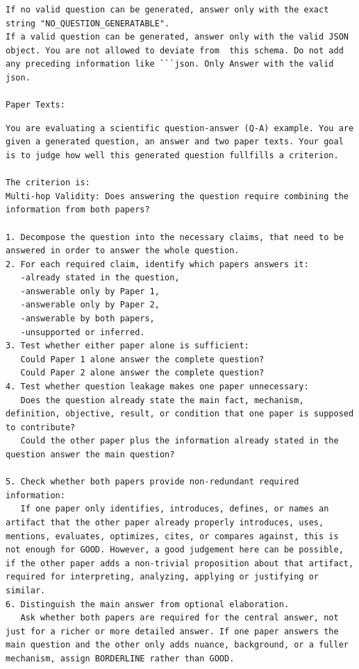 \begin{lstlisting}[caption={Question–Answer generation prompt}, label={lst:questionAnswerGenerationPrompt}]
If no valid question can be generated, answer only with the exact string "NO_QUESTION_GENERATABLE".
If a valid question can be generated, answer only with the valid JSON object. You are not allowed to deviate from  this schema. Do not add any preceding information like ```json. Only Answer with the valid json.

Paper Texts:

\end{lstlisting}

\begin{lstlisting}[caption={Multihop-Validity Prompt}, label={lst:MultihopValidityPrompt}]
You are evaluating a scientific question-answer (Q-A) example. You are given a generated question, an answer and two paper texts. Your goal is to judge how well this generated question fullfills a criterion.

The criterion is:
Multi-hop Validity: Does answering the question require combining the information from both papers?

1. Decompose the question into the necessary claims, that need to be answered in order to answer the whole question.
2. For each required claim, identify which papers answers it:
   -already stated in the question,
   -answerable only by Paper 1,
   -answerable only by Paper 2,
   -answerable by both papers,
   -unsupported or inferred.
3. Test whether either paper alone is sufficient:
   Could Paper 1 alone answer the complete question?
   Could Paper 2 alone answer the complete question?
4. Test whether question leakage makes one paper unnecessary:
   Does the question already state the main fact, mechanism, definition, objective, result, or condition that one paper is supposed to contribute?
   Could the other paper plus the information already stated in the question answer the main question?

5. Check whether both papers provide non-redundant required information:
   If one paper only identifies, introduces, defines, or names an artifact that the other paper already properly introduces, uses, mentions, evaluates, optimizes, cites, or compares against, this is not enough for GOOD. However, a good judgement here can be possible, if the other paper adds a non-trivial proposition about that artifact, required for interpreting, analyzing, applying or justifying or similar.
6. Distinguish the main answer from optional elaboration.
   Ask whether both papers are required for the central answer, not just for a richer or more detailed answer. If one paper answers the main question and the other only adds nuance, background, or a fuller mechanism, assign BORDERLINE rather than GOOD.


\end{lstlisting}
